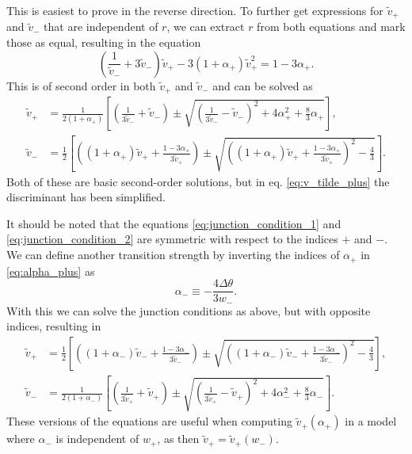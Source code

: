 This is easiest to prove in the reverse direction.
To further get expressions for $\tilde{v}_+$ and $\tilde{v}_-$ that are independent of $r$, we can extract $r$ from both equations and mark those as equal, resulting in the equation
\begin{equation}
\left( \frac{1}{\tilde{v}_-} + 3 \tilde{v}_- \right) \tilde{v}_+ - 3(1+\alpha_+)\tilde{v}_+^2 = 1 - 3\alpha_+.
\end{equation}
This is of second order in both $\tilde{v}_+$ and $\tilde{v}_-$ and can be solved as \cite[eq. B.6, B.7]{hindmarsh_gw_pt_2019}
\begin{align}
\tilde{v}_+ &= \frac{1}{2(1+\alpha_+)}\left[ \left(\frac{1}{3\tilde{v}_-}+\tilde{v}_-\right) \pm \sqrt{\left(\frac{1}{3\tilde{v}_-} - \tilde{v}_- \right)^2 + 4\alpha_+^2 + \frac{8}{3} \alpha_+} \right],
\label{eq:v_tilde_plus}
\\
\tilde{v}_- &= \frac{1}{2} \left[ \left( (1+\alpha_+)\tilde{v}_+ + \frac{1-3\alpha_+}{3\tilde{v}_+} \right) \pm \sqrt{\left((1+\alpha_+)\tilde{v}_+ + \frac{1-3\alpha_+}{3\tilde{v}_+} \right)^2 - \frac{4}{3}} \right].
\label{eq:v_tilde_minus}
\end{align}
Both of these are basic second-order solutions, but in eq. \eqref{eq:v_tilde_plus} the discriminant has been simplified.

It should be noted that the equations \ref{eq:junction_condition_1} and \ref{eq:junction_condition_2} are symmetric with respect to the indices $+$ and $-$.
We can define another transition strength by inverting the indices of $\alpha_+$ in \ref{eq:alpha_plus} as
\begin{equation}
\alpha_- \equiv - \frac{4 \Delta \theta}{3 w_-}.
\end{equation}
With this we can solve the junction conditions as above, but with opposite indices, resulting in
\begin{align}
\tilde{v}_+ &= \frac{1}{2} \left[ \left( (1+\alpha_-)\tilde{v}_- + \frac{1-3\alpha_-}{3\tilde{v}_-} \right) \pm \sqrt{\left((1+\alpha_-)\tilde{v}_- + \frac{1-3\alpha_-}{3\tilde{v}_-} \right)^2 - \frac{4}{3}} \right],
\label{eq:v_tilde_plus_reverse}
\\
\tilde{v}_- &= \frac{1}{2(1+\alpha_-)}\left[ \left(\frac{1}{3\tilde{v}_+}+\tilde{v}_+\right) \pm \sqrt{\left(\frac{1}{3\tilde{v}_+} - \tilde{v}_+ \right)^2 + 4\alpha_-^2 + \frac{8}{3} \alpha_-} \right].
\label{eq:v_tilde_minus_reverse}
\end{align}
These versions of the equations are useful when computing $\tilde{v}_+(\alpha_+)$ in a model where $\alpha_-$ is independent of $w_+$, as then $\tilde{v}_+ = \tilde{v}_+(w_-)$.

